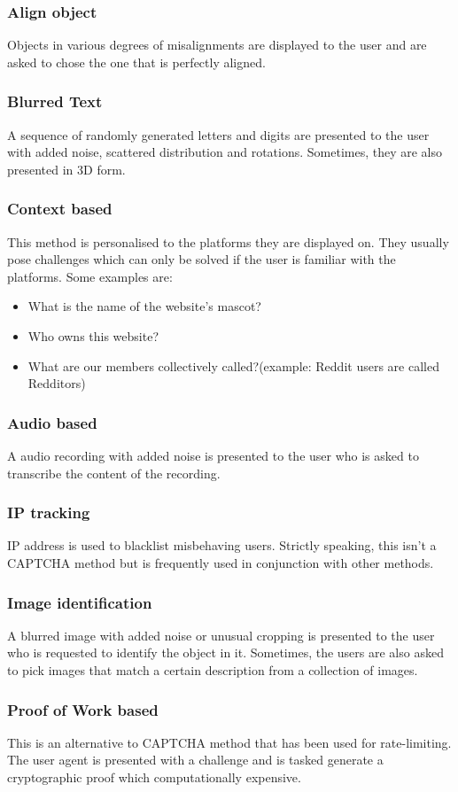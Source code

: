 \documentclass[conference]{IEEEtran}
\begin{document}
\subsubsection{Align object}
Objects in various degrees of misalignments are displayed to the user and are
asked to chose the one that is perfectly aligned.

\subsubsection{Blurred Text}
A sequence of randomly generated letters and digits are 
		presented to the user with added noise, scattered distribution and
		rotations. Sometimes, they are also presented in 3D form. 

\subsubsection{Context based}
This method is personalised to the platforms they are displayed on. They usually
pose challenges which can only be solved if the user is familiar with the
platforms. Some examples are:
	\begin{itemize}
		\item What is the name of the website's mascot?  
		\item Who owns this website?
		\item What are our members collectively called?(example: Reddit users are
			called Redditors)
	\end{itemize}

\subsubsection{Audio based}
A audio recording with added noise is presented to the user who is asked to
transcribe the content of the recording.

\subsubsection{IP tracking}
IP address is used to blacklist misbehaving users. Strictly speaking, this isn't
a CAPTCHA method but is frequently used in conjunction with other methods.

\subsubsection{Image identification}
A blurred image with added noise or unusual cropping is presented to the user
who is requested to identify the object in it. Sometimes, the users are also
asked to pick images that match a certain description from a collection of
images.

\subsubsection{Proof of Work based}
This is an alternative to CAPTCHA method that has been used for rate-limiting.
The user agent is presented with a challenge and is tasked generate a
cryptographic proof which computationally expensive.
\end{document}

